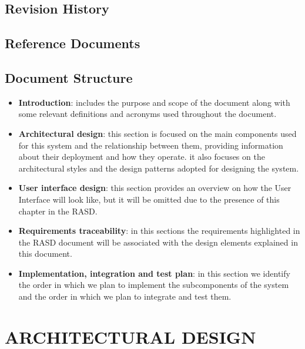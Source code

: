 \documentclass[12pt,a4paper]{article}
\begin{document}
\subsection{Revision History}
\subsection{Reference Documents}
\subsection{Document Structure}
\begin{itemize}
\item \textbf{Introduction}: includes the purpose and scope of the document along with some relevant definitions and acronyms used throughout the document.
\item \textbf{Architectural design}: this section is focused on the main components used for this system and the relationship between them, providing information about their
deployment and how they operate. it also focuses on the architectural styles and the design patterns adopted for designing the system.
\item \textbf{User interface design}: this section provides an overview on how the User Interface will look like, but it will be omitted due to the presence of this chapter in the RASD.
\item \textbf{Requirements traceability}: in this sections the requirements highlighted in the RASD document will be associated with the design elements explained in this document.
\item \textbf{Implementation, integration and test plan}: in this section we identify the order in which we plan to implement the subcomponents of the system and the order in which we plan to
integrate and test them.
\end{itemize}
\newpage
\section{ARCHITECTURAL DESIGN}
\end{document}
